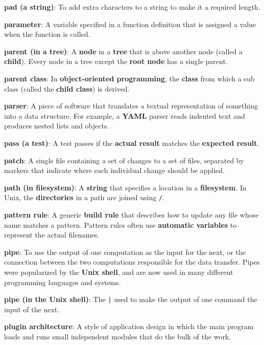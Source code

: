 \documentclass[krantzl]{krantz}
\newcommand{\glosskey}[1]{\textbf{#1}}
\begin{document}
\noindent \textbf{\glosskey{pad (a string)}}: 
To add extra characters to a string to make it a required length.


\noindent \textbf{\glosskey{parameter}}: 
A variable specified in a function definition that is assigned a value when the function is called.


\noindent \textbf{\glosskey{parent (in a tree)}}: 
A \glosskey{node} in a \glosskey{tree} that is above another node (called a \glosskey{child}). Every node in a tree except the \glosskey{root node} has a single parent.


\noindent \textbf{\glosskey{parent class}}: 
In \glosskey{object-oriented programming}, the \glosskey{class} from which a sub class (called the \glosskey{child class}) is derived.


\noindent \textbf{\glosskey{parser}}: 
A piece of software that translates a textual representation of something into a data structure. For example, a \glosskey{YAML} parser reads indented text and produces nested lists and objects.


\noindent \textbf{\glosskey{pass (a test)}}: 
A test passes if the \glosskey{actual result} matches the \glosskey{expected result}.


\noindent \textbf{\glosskey{patch}}: 
A single file containing a set of changes to a set of files, separated by markers that indicate where each individual change should be applied.


\noindent \textbf{\glosskey{path (in filesystem)}}: 
A \glosskey{string} that specifies a location in a \glosskey{filesystem}. In Unix, the \glosskey{directories} in a path are joined using \texttt{/}.


\noindent \textbf{\glosskey{pattern rule}}: 
A generic \glosskey{build rule} that describes how to update any file whose name matches a pattern. Pattern rules often use \glosskey{automatic variables} to represent the actual filenames.


\noindent \textbf{\glosskey{pipe}}: 
To use the output of one computation as the input for the next, or the connection between the two computations responsible for the data transfer. Pipes were popularized by the \glosskey{Unix shell}, and are now used in many different programming languages and systems.


\noindent \textbf{\glosskey{pipe (in the Unix shell)}}: 
The \texttt{|} used to make the output of one command the input of the next.


\noindent \textbf{\glosskey{plugin architecture}}: 
A style of application design in which the main program loads and runs small independent modules that do the bulk of the work.
\end{document}

